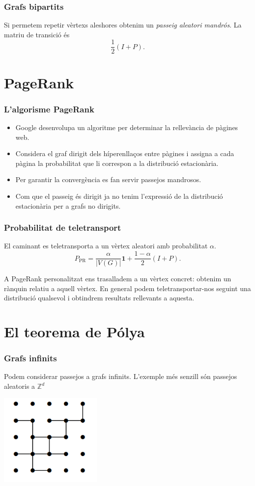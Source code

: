 \documentclass[aspectratio=169, 12pt]{beamer}
\newcommand{\Z}{\mathbb{Z}}
\newcommand{\abs}[1]{\left\lvert #1 \right\rvert}
\begin{document}
\begin{frame}
\frametitle{Grafs bipartits}
Si permetem repetir vèrtexs aleshores obtenim un \emph{passeig aleatori mandrós}. \pause La matriu de transició és \[ \frac{1}{2}(I + P). \]
\end{frame}


\section{PageRank}
\begin{frame}
\frametitle{L'algorisme PageRank}
\begin{itemize}[<+->]
	\item Google desenvolupa un algoritme per determinar la rellevància de pàgines web. 
	\item Considera el graf dirigit dels híperenllaços entre pàgines i assigna a cada pàgina la probabilitat que li correspon a la distribució estacionària.  
	\item Per garantir la convergència es fan servir passejos mandrosos. 
	\item Com que el passeig és dirigit ja no tenim l'expressió de la distribució estacionària per a grafs no dirigits.
\end{itemize}
\end{frame}

\begin{frame}
\frametitle{Probabilitat de teletransport}
El caminant es teletransporta a un vèrtex aleatori amb probabilitat \( \alpha \). \pause 
\begin{equation*}
	P_\text{PR} = \frac{\alpha}{\abs{V(G)}}\bm{1} + \frac{1 - \alpha}{2}(I + P).
\end{equation*} \pause

A PageRank personalitzat ens trasalladem a un vèrtex concret: obtenim un rànquin relatiu a aquell vèrtex. \pause En general podem teletransportar-nos seguint una distribució qualsevol i obtindrem resultats rellevants a aquesta. 

\end{frame}

\section{El teorema de Pólya}
\begin{frame}
	\frametitle{Grafs infinits}
	Podem considerar passejos a grafs infinits. L'exemple més senzill són passejos aleatoris a \( \Z^d \)

	\centering
	\includegraphics[width=50mm]{reticle.png}
\end{frame}
\end{document}
